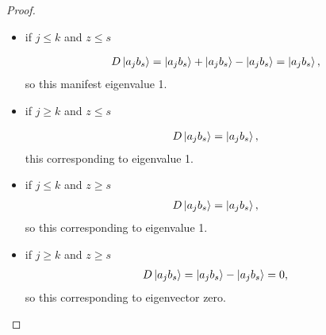 \begin{proof}
\begin{itemize}
\item if $j\leq k$ and $z\leq s$ 

\begin{align*}
D\ket{a_jb _s}=\ket{a_jb _s}+\ket{a_jb _s}-\ket{a_jb _s}=\ket{a_jb _s},
\end{align*} 
 so this manifest eigenvalue 1.
\item if $j\geqslant k$ and $z\leq s$

 \begin{align*}
 D\ket{a_jb_s}=\ket{a_jb_s},
\end{align*}  
 this corresponding to eigenvalue 1.
\item if $j\leq k$ and $z\geq s$ 
 \begin{align*}
 D\ket{a_jb_s}=\ket{a_jb_s},
\end{align*} 
so this corresponding to eigenvalue 1.
\item if $j\geqslant k$ and $z\geqslant s$ 
\begin{align*}
D\ket{a_jb_s}=\ket{a_jb_s}-\ket{a_jb_s}=0,
\end{align*}
so this corresponding to eigenvector zero.
\end{itemize}
\end{proof}